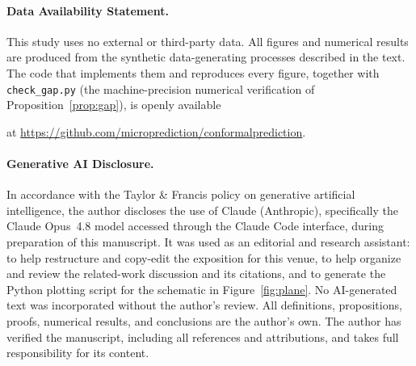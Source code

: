 \documentclass[11pt]{article}
\newif\ifanon\anonfalse
\theoremstyle{definition}
\begin{document}
\paragraph{Data Availability Statement.} This study uses no external or third-party data.
All figures and numerical results are produced from the synthetic data-generating processes
described in the text. The code that implements them and reproduces every figure, together
with \texttt{check\_gap.py} (the machine-precision numerical verification of
Proposition~\ref{prop:gap}), is openly available
\ifanon
as supplementary material accompanying this submission (the public repository URL is omitted
for anonymous review).
\else
at \url{https://github.com/microprediction/conformalprediction}.
\fi

\paragraph{Generative AI Disclosure.} In accordance with the Taylor \& Francis policy on
generative artificial intelligence, the author discloses the use of Claude (Anthropic),
specifically the Claude Opus~4.8 model accessed through the Claude Code interface, during
preparation of this manuscript. It was used as an editorial and research assistant: to help
restructure and copy-edit the exposition for this venue, to help organize and review the
related-work discussion and its citations, and to generate the Python plotting script for the
schematic in Figure~\ref{fig:plane}. No AI-generated text was incorporated without the
author's review. All definitions, propositions, proofs, numerical results, and conclusions
are the author's own. The author has verified the manuscript, including all references and
attributions, and takes full responsibility for its content.



\end{document}
